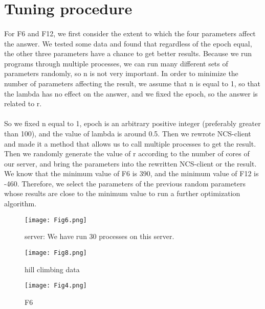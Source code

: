 \documentclass[10pt,letterpaper]{article}
\begin{document}
\section{Tuning procedure}

\paragraph{}
For F6 and F12, we first consider the extent to which the four parameters affect the answer. We tested some data and found that regardless of the epoch equal, the other three parameters have a chance to get better results. Because we run programs through multiple processes, we can run many different sets of parameters randomly, so n is not very important. In order to minimize the number of parameters affecting the result, we assume that n is equal to 1, so that the lambda has no effect on the answer, and we fixed the epoch, so the answer is related to r.

\paragraph{}
So we fixed n equal to 1, epoch is an arbitrary positive integer (preferably greater than 100), and the value of lambda is around 0.5. Then we rewrote NCS-client and made it a method that allows us to call multiple processes to get the result. Then we randomly generate the value of r according to the number of cores of our server, and bring the parameters into the rewritten NCS-client or the result. We know that the minimum value of F6 is 390, and the minimum value of F12 is -460. Therefore, we select the parameters of the previous random parameters whose results are close to the minimum value to run a further optimization algorithm.

\begin{figure}[H]
  \centering
  \texttt{[image: Fig6.png]}\\
  \caption{server: We have run 30 processes on this server.}
  \label{straddltimeScale}
\end{figure}

\begin{figure}[H]
  \centering
  \texttt{[image: Fig8.png]}\\
  \caption{hill climbing data}
  \label{straddltimeScale}
\end{figure}

\begin{figure}[H]
  \centering
  \texttt{[image: Fig4.png]}\\
  \caption{F6}
  \label{straddltimeScale}
\end{figure}
\end{document}
